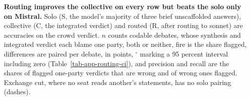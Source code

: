\begin{table}[t]
\centering
\small
\caption{\textbf{Routing improves the collective on every row but beats the solo
only on Mistral.} Solo (S, the model's majority of three brief unscaffolded
answers), collective (C, the integrated verdict) and routed (R, after routing
to sonnet) are accuracies on the crowd verdict. $n$ counts codable debates,
whose synthesis and integrated verdict each blame one party, both or
neither, fire is the share flagged, differences are paired per debate, in
points, $^{\circ}$ marking a 95 percent interval including zero
(Table~\ref{tab-app-routing-ci}), and precision and recall are the shares of
flagged one-party verdicts that are wrong and of wrong ones flagged. Exchange
cut, where no seat reads another's statements, has no solo pairing (dashes).}
\label{tab-routing}

\end{table}
